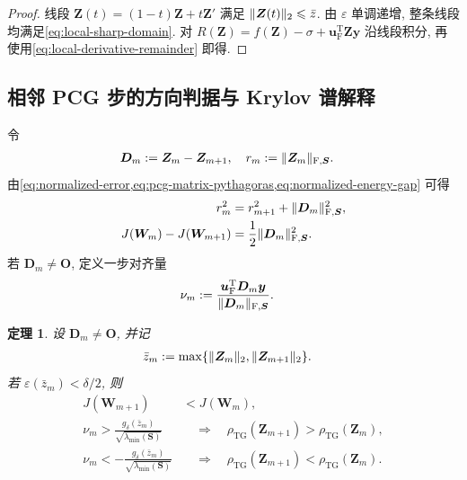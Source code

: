 \documentclass{ctexart}
\newcommand{\q}{\quad}
\newcommand{\T}{\mathrm{T}}
\newcommand{\dt}{\delta}
\renewcommand{\le}{\leqslant}
\DeclarePairedDelimiter\norm{\lVert}{\rVert}
\newtheorem{theorem}{定理}[section]
\begin{document}
\begin{proof}
线段 $\bm Z(t)=(1-t)\bm Z+t\bm Z'$ 满足
$\norm{\bm Z(t)}_2\le\bar z$. 由 $\varepsilon$ 单调递增, 整条线段均满足\cref{eq:local-sharp-domain}. 对
$R(\bm Z)=f(\bm Z)-\sigma+\bm u_{\mathrm F}^\T\bm Z\bm y$
沿线段积分, 再使用\cref{eq:local-derivative-remainder} 即得.
\end{proof}


\subsection{相邻 PCG 步的方向判据与 Krylov 谱解释}
\label{subsec:sharp-step-criterion}

令
\begin{align}
    \bm D_m&:=\bm Z_m-\bm Z_{m+1},\q
    r_m:=\norm{\bm Z_m}_{\mathrm F,\bm S}.
    \label{eq:path-step-and-radius}
\end{align}
由\cref{eq:normalized-error,eq:pcg-matrix-pythagoras,eq:normalized-energy-gap} 可得
\begin{align}
    r_m^2&=r_{m+1}^2+\norm{\bm D_m}_{\mathrm F,\bm S}^2,
    \label{eq:path-radius-pythagoras}\\
    J(\bm W_m)-J(\bm W_{m+1})&=\frac12\norm{\bm D_m}_{\mathrm F,\bm S}^2.
    \label{eq:path-energy-decrease}
\end{align}
若 $\bm D_m\ne\mathbf O$, 定义一步对齐量
\begin{align}
    \nu_m&:=\frac{\bm u_{\mathrm F}^\T\bm D_m\bm y}
    {\norm{\bm D_m}_{\mathrm F,\bm S}}.
    \label{eq:alignment-nu}
\end{align}


\begin{theorem}
\label{thm:pcg-two-sided-step-criterion}
设 $\bm D_m\ne\mathbf O$, 并记
\begin{align}
    \bar z_m&:=\max\{\norm{\bm Z_m}_2,\norm{\bm Z_{m+1}}_2\}.
    \label{eq:step-zbar}
\end{align}
若 $\varepsilon(\bar z_m)<\dt/2$, 则
\begin{align}
    J(\bm W_{m+1})&<J(\bm W_m),
    \label{eq:step-energy-strict-decrease}\\
    \nu_m>
    \frac{g_\dt(\bar z_m)}{\sqrt{\lambda_{\min}(\bm S)}}
    &\q\Longrightarrow\q
    \rho_{\mathrm{TG}}(\bm Z_{m+1})>\rho_{\mathrm{TG}}(\bm Z_m),
    \label{eq:step-deterioration-sharp}\\
    \nu_m<-
    \frac{g_\dt(\bar z_m)}{\sqrt{\lambda_{\min}(\bm S)}}
    &\q\Longrightarrow\q
    \rho_{\mathrm{TG}}(\bm Z_{m+1})<\rho_{\mathrm{TG}}(\bm Z_m).
    \label{eq:step-improvement-sharp}
\end{align}
\end{theorem}
\end{document}
